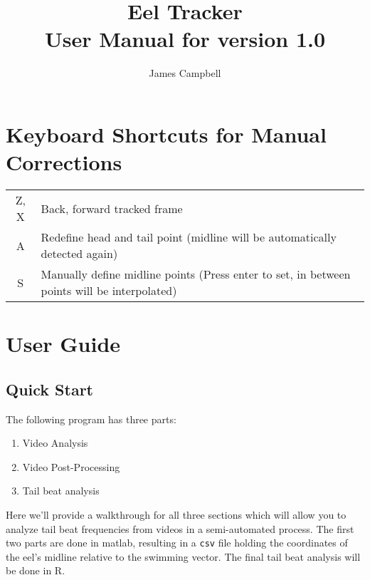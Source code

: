 \documentclass[11pt]{report}
\title{Eel Tracker\\ \Large User Manual for version 1.0}
\author{James Campbell}
\begin{document}
\maketitle

\tableofcontents

\newcommand{\screenshot}[2]{
\begin{center}
\texttt{[image: \#1]}
\end{center}
}

\chapter{Keyboard Shortcuts for Manual Corrections}\label{keyboard}

\begin{table}[h!]
  \begin{center}
    \begin{tabular}{cl}
      \toprule
      Z, X & Back, forward tracked frame \\
      A & Redefine head and tail point (midline will be automatically detected again) \\
      S & Manually define midline points (Press enter to set, in between points will be interpolated) \\
      \bottomrule
    \end{tabular}
  \end{center}
\end{table}

\chapter{User Guide}

\section{Quick Start}

The following program has three parts:

\begin{enumerate}
  \item Video Analysis
  \item Video Post-Processing
  \item Tail beat analysis
\end{enumerate}

Here we'll provide a walkthrough for all three sections which will allow you to analyze tail beat frequencies from videos in a semi-automated process.  The first two parts are done in matlab, resulting in a \texttt{csv} file holding the coordinates of the eel's midline relative to the swimming vector.  The final tail beat analysis will be done in R.
\end{document}
